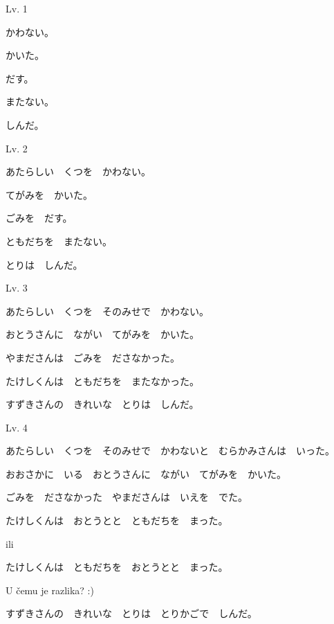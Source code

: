	\newpage
	
	\begin{mondai}{Lv. 1}
		\item かわない。
		\item かいた。
		\item だす。
		\item またない。
		\item しんだ。
	\end{mondai}

	\begin{mondai}{Lv. 2}
		\item あたらしい　くつを　かわない。
		\item てがみを　かいた。
		\item ごみを　だす。
		\item ともだちを　またない。
		\item とりは　しんだ。
	\end{mondai}

	\begin{mondai}{Lv. 3}
		\item あたらしい　くつを　そのみせで　かわない。
		\item おとうさんに　ながい　てがみを　かいた。
		\item やまださんは　ごみを　ださなかった。
		\item たけしくんは　ともだちを　またなかった。
		\item すずきさんの　きれいな　とりは　しんだ。
	\end{mondai}

	\begin{mondai}{Lv. 4}
		\item あたらしい　くつを　そのみせで　かわないと　むらかみさんは　いった。
		\item *おおさかに　いる　おとうさんに　ながい　てがみを　かいた。
		\item *ごみを　ださなかった　やまださんは　いえを　でた。
		\item たけしくんは　おとうとと　ともだちを　まった。
		
		ili
		
		たけしくんは　ともだちを　おとうとと　まった。
		
		U čemu je razlika? :)
		\item すずきさんの　きれいな　とりは　とりかごで　しんだ。
	\end{mondai}
